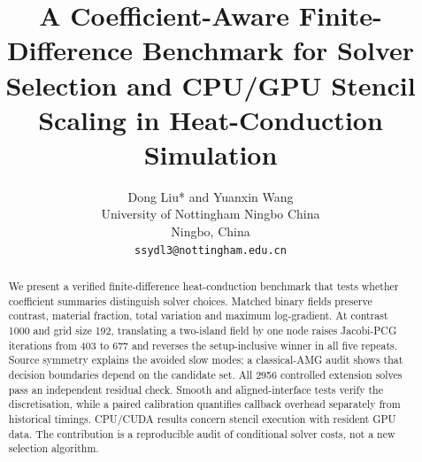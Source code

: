 \documentclass[10pt]{article}
\title{A Coefficient-Aware Finite-Difference Benchmark for Solver Selection and CPU/GPU Stencil Scaling in Heat-Conduction Simulation}
\author{Dong Liu* and Yuanxin Wang\\University of Nottingham Ningbo China\\Ningbo, China\\\texttt{ssydl3@nottingham.edu.cn}}
\date{}
\begin{document}
\maketitle
\begin{abstract}
We present a verified finite-difference heat-conduction benchmark that tests whether coefficient summaries distinguish solver choices. Matched binary fields preserve contrast, material fraction, total variation and maximum log-gradient. At contrast 1000 and grid size 192, translating a two-island field by one node raises Jacobi-PCG iterations from 403 to 677 and reverses the setup-inclusive winner in all five repeats. Source symmetry explains the avoided slow modes; a classical-AMG audit shows that decision boundaries depend on the candidate set. All 2956 controlled extension solves pass an independent residual check. Smooth and aligned-interface tests verify the discretisation, while a paired calibration quantifies callback overhead separately from historical timings. CPU/CUDA results concern stencil execution with resident GPU data. The contribution is a reproducible audit of conditional solver costs, not a new selection algorithm.
\end{abstract}
\end{document}
